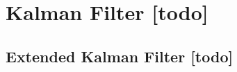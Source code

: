 \begin{comment}
------------------------------------------------------------------------------------------
- \cite{kalman1960new}
- \cite{kurth2003experimental}
	- Originally introduced in 1960, the Kalman lter assumes a multivariate Gaussian distribution [6]. The Kalman lter has the advantage that the representation of the distribution is compact; a Gaussian distribution can be represented by a mean and a covariance matrix. The robot's pose estimation is maintained as a Gaussian distribution and sensor data from dead reckoning and landmark observations is fused to obtain a new position distribution.
	- Our results with Kalman ltering require an under-standing of the characteristics of the noise present in ranges reported by the radio tags. We gain this by look-ing at the probability distribution functions for each tag measurement.
	- We obtain the PDFs as follows: for every reported measurement, we nd the true range to the robot when that distance was reported. We do this by comparing the known location of the reporting tag to the times-tamped true location of the robot when the report was received.
	- the covariance matrix, which describes the uncertainty and correlation of the terms in the state estimate.
	- However, when the same initial noisy tag locations are used with Test 2, our SLAM technique fails to converge. Since the Kalman lter uses a linearization of the nonlinear range measurements, if the linearized estimate is too far away from the truth, the lter may be unable to recover and will diverge.
	-

\end{comment}
\section{Kalman Filter [todo]}




\begin{comment}
------------------------------------------------------------------------------------------
- \cite{kurth2003experimental}
	- Recent extensions of Kalman ltering allow for non-Gaussian, multimodal probability distributions through multiple hypothesis tracking. The result is a more versatile estimation technique that still preserves many of the computational advantages of the Kalman filter.
\end{comment}
\subsection{Extended Kalman Filter [todo]}

